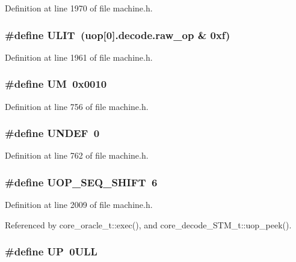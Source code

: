 Definition at line 1970 of file machine.h.
\subsubsection[{ULIT}]{\setlength{\rightskip}{0pt plus 5cm}\#define ULIT~(uop[0].decode.raw\_\-op \& 0xf)}\label{machine_8h_951bd7a1cad5c07101a0f1ab0179c3ea}




Definition at line 1961 of file machine.h.
\subsubsection[{UM}]{\setlength{\rightskip}{0pt plus 5cm}\#define UM~0x0010}\label{machine_8h_4b9cfb88c6beb4254e2971abacbd8aab}




Definition at line 756 of file machine.h.
\subsubsection[{UNDEF}]{\setlength{\rightskip}{0pt plus 5cm}\#define UNDEF~0}\label{machine_8h_bde25a67f4046530ae1c572cefeb5869}




Definition at line 762 of file machine.h.
\subsubsection[{UOP\_\-SEQ\_\-SHIFT}]{\setlength{\rightskip}{0pt plus 5cm}\#define UOP\_\-SEQ\_\-SHIFT~6}\label{machine_8h_a815a6d01e28ecb0f60fcde13fc11e4a}




Definition at line 2009 of file machine.h.

Referenced by core\_\-oracle\_\-t::exec(), and core\_\-decode\_\-STM\_\-t::uop\_\-peek().
\subsubsection[{UP}]{\setlength{\rightskip}{0pt plus 5cm}\#define UP~0ULL}\label{machine_8h_1965eaca47dbf3f87acdafc2208f04eb}





